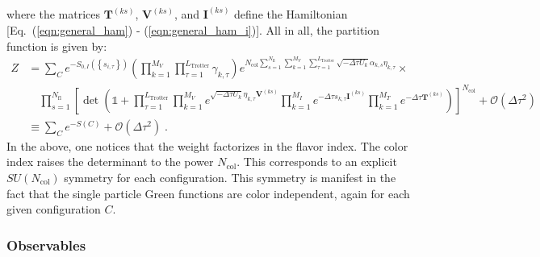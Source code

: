 where the matrices $\bm{T}^{(ks)}$,  $\bm{V}^{(ks)}$, and  $\bm{I}^{(ks)}$ define the Hamiltonian [Eq.~(\ref{eqn:general_ham}) - (\ref{eqn:general_ham_i})].
All in all, the partition function is given by:
\begin{align}\label{eqn:partition_2}
    Z  &=   \sum_{C}   e^{-S_{0,I} \left( \left\{ s_{i,\tau} \right\}  \right) }     \left( \prod_{k=1}^{M_V} \prod_{\tau=1}^{L_{\mathrm{Trotter}}} \gamma_{k,\tau} \right)
    e^{ N_{\mathrm{col}}\sum\limits_{s=1}^{N_{\mathrm{fl}}} \sum\limits_{k=1}^{M_V} \sum\limits_{\tau = 1}^{L_{\mathrm{Trotter}}}\sqrt{-\Delta \tau U_k}  \alpha_{k,s} \eta_{k,\tau} } 
  \times   \nonumber \\
  &\quad
      \prod_{s=1}^{N_{\mathrm{fl}}}\left[\det\left(  \mathds{1} + 
     \prod_{\tau=1}^{L_{\mathrm{Trotter}}}   
    \prod_{k=1}^{M_V}   e^{  \sqrt{ -\Delta \tau  U_k} \eta_{k,\tau} {\bm V}^{(ks)} }   \prod_{k=1}^{M_I}   e^{  -\Delta \tau s_{k,\tau}  {\bm I}^{(ks)}}  
     \prod_{k=1}^{M_T}   e^{-\Delta \tau {\bm T}^{(ks)}} 
     \right) \right]^{N_{\mathrm{col}}} + \mathcal{O}(\Delta\tau^{2}) \nonumber \\ 
     & \equiv  \sum_{C} e^{-S(C) } + \mathcal{O}(\Delta\tau^{2})\;.
\end{align}
In the above, one notices that the weight factorizes in  the flavor index. The color index raises the determinant to the power $N_{\mathrm{col}}$. 
This corresponds to  an explicit $SU(N_{\mathrm{col}})$ symmetry   for each  configuration. This symmetry is manifest in the fact that the single particle  Green functions are color independent, again for each given  configuration $C$.

\subsubsection{Observables}\label{Observables.General}

